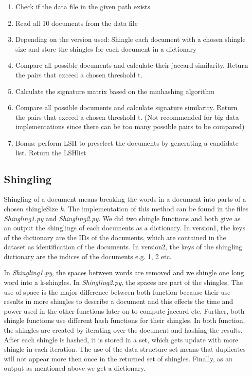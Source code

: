 \documentclass[a4paper, 11pt]{article}
\begin{document}
\begin{enumerate}

\item Check if the data file in the given path exists

\item Read all 10 documents from the data file

\item Depending on the version used: Shingle each document with a chosen shingle size and store the shingles for each document in a dictionary 

\item Compare all possible documents and calculate their jaccard similarity. Return the pairs that exceed a chosen threshold t.

\item Calculate the signature matrix based on the minhashing algorithm

\item Compare all possible documents and calculate signature similarity. Return the pairs that exceed a chosen threshold t. (Not recommended for big data implementations since there can be too many possible pairs to be compared)

\item Bonus: perform LSH to preselect the documents by generating a candidate list. Return the LSHlist 

\end{enumerate}

 \subsection{Shingling}
 \label{Sec:Shingling}
 Shingling of a document means breaking the words in a document into parts of a chosen shingleSize $k$. The implementation of this method can be found in the files \textit{Shingling1.py} and \textit{Shingling2.py}. We did two shingle functions and both give as an output the shinglings of each documents as a dictionary. In version1, the keys of the dictionary are the IDs of the documents, which are contained in the dataset as identification of the documents. In version2, the keys of the shingling dictionary are the indices of the documents e.g. 1, 2 etc. 
 
 In \textit{Shingling1.py}, the spaces between words are removed and we shingle one long word into a k-shingles. In \textit{Shingling2.py}, the spaces are part of the shingles. The use of space is the major difference between both function because their use results in more shingles to describe a document and this  effects the time and power used in the other functions later on to compute jaccard etc. Further, both shingle functions use different hash functions for their shingles. In both function, the shingles are created by iterating over the document and hashing the results. After each shingle is hashed, it is stored in a set, which gets update with more shingle in each iteration. The use of the data structure set means that duplicates will not appear more then once in the returned set of shingles. Finally, as an output as mentioned above we get a dictionary.
 
\end{document}
